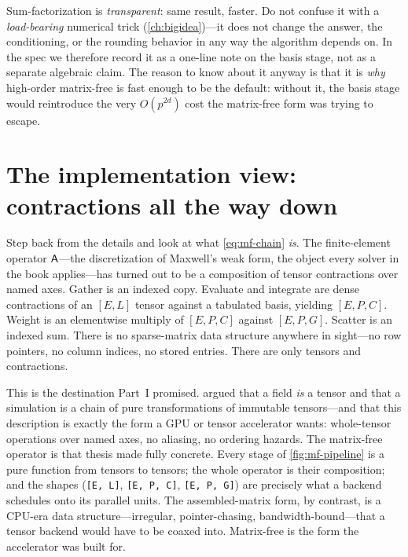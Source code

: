 \begin{pitfall}
Sum-factorization is \emph{transparent}: same result, faster. Do not confuse it
with a \emph{load-bearing} numerical trick (\cref{ch:bigidea})---it does not
change the answer, the conditioning, or the rounding behavior in any way the
algorithm depends on. In the spec we therefore record it as a one-line note on
the basis stage, not as a separate algebraic claim. The reason to know about it
anyway is that it is \emph{why} high-order matrix-free is fast enough to be the
default: without it, the basis stage would reintroduce the very $O(p^{2d})$ cost
the matrix-free form was trying to escape.
\end{pitfall}

\section{The implementation view: contractions all the way down}
\label{sec:mf-impl-view}

Step back from the details and look at what \cref{eq:mf-chain} \emph{is}. The
finite-element operator $\mathsf{A}$---the discretization of Maxwell's weak form, the
object every solver in the book applies---has turned out to be a composition of
tensor contractions over named axes. Gather is an indexed copy. Evaluate and
integrate are dense contractions of an $[E,L]$ tensor against a tabulated basis,
yielding $[E,P,C]$. Weight is an elementwise multiply of $[E,P,C]$ against
$[E,P,G]$. Scatter is an indexed sum. There is no sparse-matrix data structure
anywhere in sight---no row pointers, no column indices, no stored entries. There
are only tensors and contractions.

This is the destination Part~I promised.  argued that a field
\emph{is} a tensor and that a simulation is a chain of pure transformations of
immutable tensors---and that this description is exactly the form a GPU or tensor
accelerator wants: whole-tensor operations over named axes, no aliasing, no
ordering hazards. The matrix-free operator is that thesis made fully concrete.
Every stage of \cref{fig:mf-pipeline} is a pure function from tensors to tensors;
the whole operator is their composition; and the shapes
(\lstinline[style=l4style]|[E, L]|, \lstinline[style=l4style]|[E, P, C]|,
\lstinline[style=l4style]|[E, P, G]|) are precisely what a backend schedules onto
its parallel units. The assembled-matrix form, by contrast, is a CPU-era data
structure---irregular, pointer-chasing, bandwidth-bound---that a tensor backend
would have to be coaxed into. Matrix-free is the form the accelerator was built
for.

